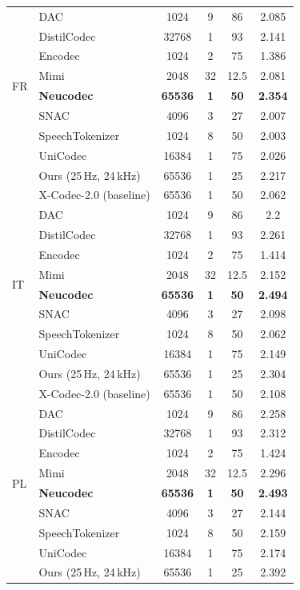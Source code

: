 \documentclass[preprint]{article}
\begin{document}
\begin{longtable}{llcccc}
\midrule
\multirow{8}{*}{FR}
  & DAC & 1024 & 9 & 86 & 2.085 \\
  & DistilCodec & 32768 & 1 & 93 & 2.141 \\
  & Encodec & 1024 & 2 & 75 & 1.386 \\
  & Mimi & 2048 & 32 & 12.5 & 2.081 \\
  & \textbf{Neucodec} & \textbf{65536} & \textbf{1} & \textbf{50} & \textbf{2.354} \\
  & SNAC & 4096 & 3 & 27 & 2.007 \\
  & SpeechTokenizer & 1024 & 8 & 50 & 2.003 \\
  & UniCodec & 16384 & 1 & 75 & 2.026 \\
  & Ours (25\,Hz, 24\,kHz) & 65536 & 1 & 25 & 2.217 \\
  & X-Codec-2.0 (baseline) & 65536 & 1 & 50 & 2.062 \\
\midrule
\multirow{8}{*}{IT}
  & DAC & 1024 & 9 & 86 & 2.2 \\
  & DistilCodec & 32768 & 1 & 93 & 2.261 \\
  & Encodec & 1024 & 2 & 75 & 1.414 \\
  & Mimi & 2048 & 32 & 12.5 & 2.152 \\
  & \textbf{Neucodec} & \textbf{65536} & \textbf{1} & \textbf{50} & \textbf{2.494} \\
  & SNAC & 4096 & 3 & 27 & 2.098 \\
  & SpeechTokenizer & 1024 & 8 & 50 & 2.062 \\
  & UniCodec & 16384 & 1 & 75 & 2.149 \\
  & Ours (25\,Hz, 24\,kHz) & 65536 & 1 & 25 & 2.304 \\
  & X-Codec-2.0 (baseline) & 65536 & 1 & 50 & 2.108 \\
\midrule
\multirow{8}{*}{PL}
  & DAC & 1024 & 9 & 86 & 2.258 \\
  & DistilCodec & 32768 & 1 & 93 & 2.312 \\
  & Encodec & 1024 & 2 & 75 & 1.424 \\
  & Mimi & 2048 & 32 & 12.5 & 2.296 \\
  & \textbf{Neucodec} & \textbf{65536} & \textbf{1} & \textbf{50} & \textbf{2.493} \\
  & SNAC & 4096 & 3 & 27 & 2.144 \\
  & SpeechTokenizer & 1024 & 8 & 50 & 2.159 \\
  & UniCodec & 16384 & 1 & 75 & 2.174 \\
  & Ours (25\,Hz, 24\,kHz) & 65536 & 1 & 25 & 2.392 \\

\end{longtable}
\end{document}
